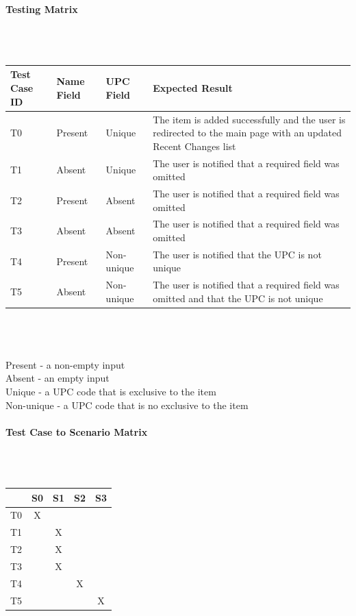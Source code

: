 \documentclass{article}
\begin{document}
\paragraph{Testing Matrix}~\\ \\
\begin{tabular}{ p{0.8in}  p{0.7in}  p{0.7in}  p{3.3in} }
\hline
Test Case ID & Name Field & UPC Field & Expected Result\\
\hline
\hline
T0 & Present & Unique & The item is added successfully and the user is redirected to the main page with an updated Recent Changes list\\
\hline
T1 & Absent & Unique & The user is notified that a required field was omitted\\
\hline
T2 & Present & Absent & The user is notified that a required field was omitted\\
\hline
T3 & Absent & Absent & The user is notified that a required field was omitted\\
\hline
T4 & Present & Non-unique & The user is notified that the UPC is not unique\\
\hline
T5 & Absent & Non-unique & The user is notified that a required field was omitted and that the UPC is not unique\\
\hline
\end{tabular}\\
~\\
~\\
Present - a non-empty input\\
Absent - an empty input\\
Unique - a UPC code that is exclusive to the item\\
Non-unique - a UPC code that is no exclusive to the item
\paragraph{Test Case to Scenario Matrix}~\\ \\
\begin{tabular}{ | c || c | c | c | c | }
\hline
   & S0 & S1 & S2 & S3 \\
\hline
\hline
T0 & X  &    &    &    \\
\hline
T1 &    & X  &    &    \\
\hline
T2 &    & X  &    &    \\
\hline
T3 &    & X  &    &    \\
\hline
T4 &    &    & X  &    \\
\hline
T5 &    &    &    & X  \\
\hline
\end{tabular}
\end{document}
